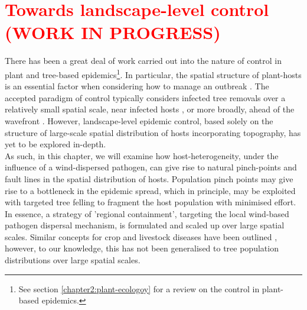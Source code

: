 
\chapter{\textcolor{red}{Towards landscape-level control (WORK IN PROGRESS)}}

There has been a great deal of work carried out into the nature of control in plant and tree-based epidemics\footnote{See section \ref{chapter2:plant-ecologoy} for a review on the control in plant-based epidemics.}. In particular, the spatial structure of plant-hosts is an essential factor when considering how to manage an outbreak \cite{spatial-control-optimisation, control-heterogeneous-landscapes}. The accepted paradigm of control typically considers infected tree removals over a relatively small spatial scale, near infected hosts \cite{WEBIDEMICS}, or more broadly, ahead of the wavefront \cite{large-scale-control}. However, landscape-level epidemic control, based solely on the structure of large-scale spatial distribution of hosts incorporating topography, has yet to be explored in-depth.\\

As such, in this chapter, we will examine how host-heterogeneity, under the influence of a wind-dispersed pathogen, can give rise to natural pinch-points and fault lines in the spatial distribution of hosts. Population pinch points may give rise to a bottleneck in the epidemic spread, which in principle, may be exploited with targeted tree felling to fragment the host population with minimised effort. In essence, a strategy of 'regional containment', targeting the local wind-based pathogen dispersal mechanism, is formulated and scaled up over large spatial scales. Similar concepts for crop and livestock diseases have been outlined \cite{PAPAIX201435, GILIOLI20131, Gilligan-disease-management}, however, to our knowledge, this has not been generalised to tree population distributions over large spatial scales.


